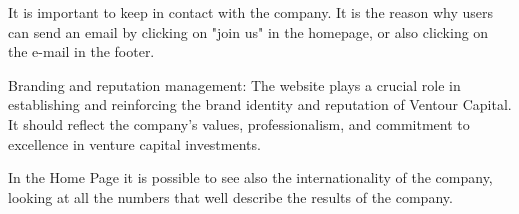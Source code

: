 \documentclass[../../DD.tex]{subfiles}
\begin{document}
    It is important to keep in contact with the company. It is the reason why users can send an email by clicking on "join us" in the homepage, or also clicking on the e-mail in the footer.

    Branding and reputation management: The website plays a crucial role in establishing and reinforcing the brand identity and reputation of Ventour Capital. It should reflect the company's values, professionalism, and commitment to excellence in venture capital investments.

    In the Home Page it is possible to see also the internationality of the company, looking at all the numbers that well describe the results of the company.
\end{document}
